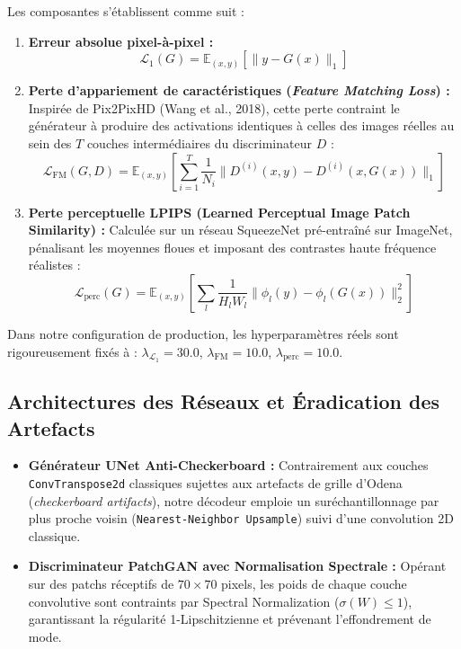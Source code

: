 \documentclass[11pt,a4paper]{report}
\begin{document}
Les composantes s'établissent comme suit :
\begin{enumerate}
    \item \textbf{Erreur absolue pixel-à-pixel :}
    \begin{equation}
        \mathcal{L}_1(G) = \mathbb{E}_{(x, y)} \left[ \| y - G(x) \|_1 \right]
    \end{equation}
    \item \textbf{Perte d'appariement de caractéristiques (\emph{Feature Matching Loss}) :}
    Inspirée de Pix2PixHD (Wang et al., 2018), cette perte contraint le générateur à produire des activations identiques à celles des images réelles au sein des $T$ couches intermédiaires du discriminateur $D$ :
    \begin{equation}
        \mathcal{L}_{\text{FM}}(G, D) = \mathbb{E}_{(x, y)} \left[ \sum_{i=1}^{T} \frac{1}{N_i} \| D^{(i)}(x, y) - D^{(i)}(x, G(x)) \|_1 \right]
    \end{equation}
    \item \textbf{Perte perceptuelle LPIPS (Learned Perceptual Image Patch Similarity) :}
    Calculée sur un réseau SqueezeNet pré-entraîné sur ImageNet, pénalisant les moyennes floues et imposant des contrastes haute fréquence réalistes :
    \begin{equation}
        \mathcal{L}_{\text{perc}}(G) = \mathbb{E}_{(x, y)} \left[ \sum_{l} \frac{1}{H_l W_l} \| \phi_l(y) - \phi_l(G(x)) \|_2^2 \right]
    \end{equation}
\end{enumerate}

Dans notre configuration de production, les hyperparamètres réels sont rigoureusement fixés à : $\lambda_{\mathcal{L}_1} = 30.0$, $\lambda_{\text{FM}} = 10.0$, $\lambda_{\text{perc}} = 10.0$.

\subsection{Architectures des Réseaux et Éradication des Artefacts}
\begin{itemize}
    \item \textbf{Générateur UNet Anti-Checkerboard :} Contrairement aux couches \texttt{ConvTranspose2d} classiques sujettes aux artefacts de grille d'Odena (\emph{checkerboard artifacts}), notre décodeur emploie un suréchantillonnage par plus proche voisin (\texttt{Nearest-Neighbor Upsample}) suivi d'une convolution 2D classique.
    \item \textbf{Discriminateur PatchGAN avec Normalisation Spectrale :} Opérant sur des patchs réceptifs de $70 \times 70$ pixels, les poids de chaque couche convolutive sont contraints par Spectral Normalization ($\sigma(W) \le 1$), garantissant la régularité 1-Lipschitzienne et prévenant l'effondrement de mode.
\end{itemize}
\end{document}
